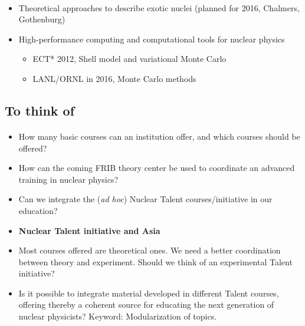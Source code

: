 \documentclass[%
twoside,                 %
final,                   %
10pt]{article}
\begin{document}
\paragraph{}
\begin{itemize}
\item Theoretical approaches to describe  exotic nuclei (planned for 2016, Chalmers, Gothenburg)

\item High-performance computing and computational tools for nuclear physics
\begin{itemize}

  \item ECT* 2012, Shell model and variational Monte Carlo

  \item LANL/ORNL in 2016, Monte Carlo methods 
\end{itemize}

\noindent
\end{itemize}

\noindent




\subsection*{To think of}

\paragraph{}
\begin{itemize}
\item How many basic courses can an institution offer, and which courses should be offered?

\item How can the coming FRIB theory center be used to coordinate an advanced training in nuclear physics?

\item Can we integrate the (\emph{ad hoc}) Nuclear Talent courses/initiative  in our education? 

\item \textbf{Nuclear Talent initiative and Asia} 

\item Most courses offered are theoretical ones. We need a better coordination between theory and experiment. Should we think of an experimental Talent initiative? 

\item Is it possible to integrate material developed in different Talent courses, offering thereby a coherent source for educating the next generation of nuclear physicists? Keyword: Modularization of topics.
\end{itemize}

\noindent










\printindex
\end{document}
